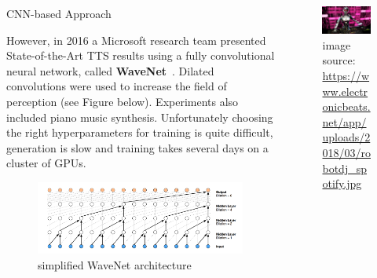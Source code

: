 \documentclass[final,hyperref={pdfpagelabels=false}]{beamer}
\newcommand{\blocktextwidth}{0.93\textwidth}
\begin{document}
\begin{frame}[t]
\begin{columns}[t]
\begin{column}{.31\textwidth}
\begin{block}{CNN-based Approach}
\begin{minipage}[]{\blocktextwidth}
However, in 2016 a Microsoft research team presented State-of-the-Art TTS results using a fully convolutional neural network, called \textbf{WaveNet}~\cite{van2016wavenet}.
Dilated convolutions were used to increase the field of perception (see Figure below).
Experiments also included piano music synthesis.
Unfortunately choosing the right hyperparameters for training is quite difficult, generation is slow and training takes several days on a cluster of GPUs.
\begin{figure}[ht]
    \label{fig:wavenet}
    \includegraphics[width=\textwidth]{wavenet-trans.png}
    \caption*{simplified WaveNet architecture}
\end{figure}

\end{minipage}
\end{block}


\end{column} %



\begin{column}{0.6375\textwidth} %

\begin{figure}[ht]
    \label{fig:robot}
    \includegraphics[width=\textwidth]{robot.jpg}
    \caption*{image source: \url{https://www.electronicbeats.net/app/uploads/2018/03/robotdj_spotify.jpg}}
\end{figure}


\end{column}
\end{columns}
\end{frame}
\end{document}
